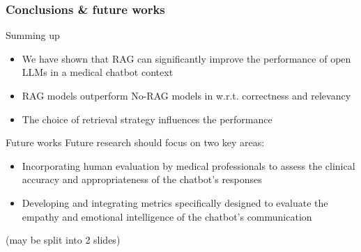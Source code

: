\documentclass[handout]{beamer}\mode<handout>{\usetheme{AMSBolognaFC}}
\begin{document}
\begin{frame}%
\frametitle{Conclusions \& future works}

\begin{block}{Summing up}
    \begin{itemize}
        \item We have shown that RAG can \alert{significantly improve} the performance of open LLMs in a medical chatbot context
        \item RAG models \alert{outperform} No-RAG models in w.r.t. correctness and relevancy
        \item The choice of \alert{retrieval strategy influences the performance}
    \end{itemize}
\end{block}

\begin{exampleblock}{Future works}
    Future research should focus on two key areas:
    \begin{itemize}
        \item Incorporating human evaluation by medical professionals to assess the clinical accuracy and appropriateness of the chatbot’s responses
        \item Developing and integrating metrics specifically designed to evaluate the empathy and emotional intelligence of the chatbot’s communication
    \end{itemize}
\end{exampleblock}

(may be split into 2 slides)

\end{frame}
\end{document}
